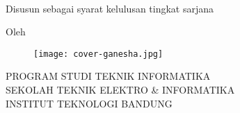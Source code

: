 \clearpage
\pagestyle{empty}


\begin{center}
  \smallskip

  \Large \bfseries \MakeUppercase{\thetitle}
  \vfill

  \Large \JenisTA \\
  \JudulTA
  \vfill

  \large Disusun sebagai syarat kelulusan tingkat sarjana
  \vfill

  \large Oleh

  \Large \theauthor

  \vfill
  \begin{figure}[!h]
    \centering
    \texttt{[image: cover-ganesha.jpg]}
  \end{figure}
  \vfill

  \large
  \uppercase{
    Program Studi Teknik Informatika \\
    Sekolah Teknik Elektro \& Informatika \\
    Institut Teknologi Bandung
  }

  \BulanTahun

\end{center}

\clearpage
